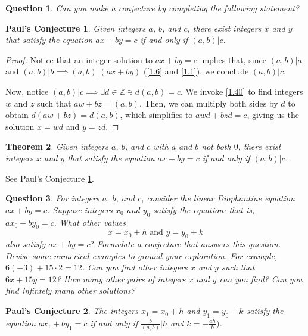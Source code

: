 \documentclass{article}
\newtheorem{thm}{Theorem}[section]
\newtheorem{ques}[thm]{Question}
\newtheorem{PC}{Paul's Conjecture}
\numberwithin{equation}{thm}
\begin{document}
\begin{ques} \label{1.47}
  Can you make a conjecture by completing the following statement?
\end{ques}

\begin{PC} \label{PC 1.47}
  Given integers $a$, $b$, and $c$, there exist integers $x$ and $y$ that satisfy the equation $ax + by = c$ if and only if $(a, b) | c$.
\end{PC}

\begin{proof}
  Notice that an integer solution to $ax + by = c$ implies that, since $(a, b) | a$ and $(a, b) | b \implies (a, b) | (ax + by)$ (\ref{1.6} and \ref{1.1}), we conclude $(a, b) | c$.

  Now, notice $(a, b) | c \implies \exists d \in \mathbb{Z} \ni d(a, b) = c$. We invoke \ref{1.40} to find integers $w$ and $z$ such that $aw + bz = (a, b)$. Then, we can multiply both sides by $d$ to obtain $d (aw + bz) = d (a,b)$, which simplifies to $awd + bzd = c$, giving us the solution $x = wd$ and $y = zd$.
\end{proof}



\begin{thm} \label{1.48}
  Given integers $a$, $b$, and $c$ with $a$ and $b$ not both $0$, there exist integers $x$ and $y$ that satisfy the equation $ax + by = c$ if and only if $(a, b) | c$.
\end{thm}

See Paul's Conjecture \ref{PC 1.47}.



\pagebreak



\begin{ques} \label{1.49}
  For integers $a$, $b$, and $c$, consider the linear Diophantine equation $ax + by = c$. Suppose integers $x_0$ and $y_0$ satisfy the equation: that is, $ax_0 + by_0 = c$. What other values
  $$x = x_0 + h \mbox{ and } y = y_0 + k$$
  also satisfy $ax + by = c?$ Formulate a conjecture that answers this question. Devise some numerical examples to ground your exploration. For example, $6(-3) + 15 \cdot 2 = 12$. Can you find other integers $x$ and $y$ such that $6x + 15y = 12$? How many other pairs of integers $x$ and $y$ can you find? Can you find infintely many other solutions?
\end{ques}

\begin{PC} \label{PC 1.49}
  The integers $x_1 = x_0 + h$ and $y_1 = y_0 + k$ satisfy the equation $ax_1 + by_1 = c$ if and only if $\frac{b}{(a, b)} | h$ and $k = - \frac{ah}{b})$.
\end{PC}
\end{document}
